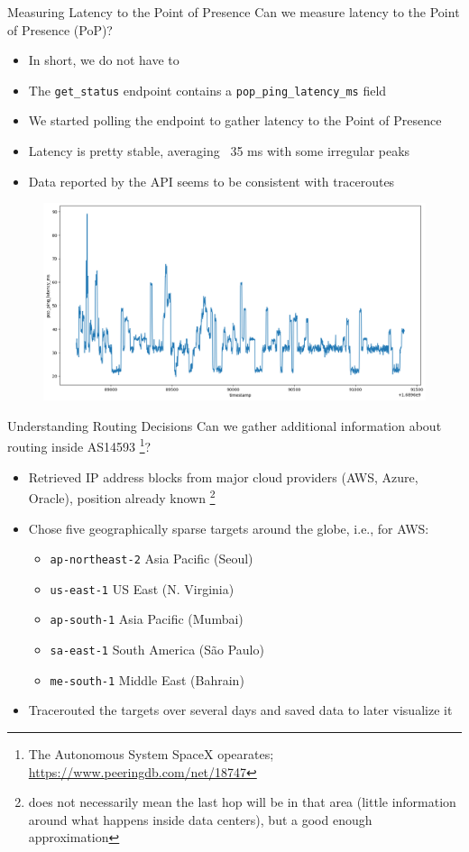 \documentclass[NET,english,beameralt]{tumbeamer}
\begin{document}
\begin{frame}{Measuring Latency to the Point of Presence}
    Can we measure latency to the Point of Presence (PoP)?
    \begin{itemize}
        \item In short, we do not have to
        \item The \texttt{get\_status} endpoint contains a  \texttt{pop\_ping\_latency\_ms} field
        \item We started polling the endpoint to gather latency to the Point of Presence
        \pause
        \item Latency is pretty stable, averaging ~35 ms with some irregular peaks
        \item Data reported by the API seems to be consistent with traceroutes
    \end{itemize}
    \begin{figure}
        \centering
        \includegraphics[width=0.6\columnwidth]{pics/latency.png}
    \end{figure}
\end{frame}

\begin{frame}{Understanding Routing Decisions}
    Can we gather additional information about routing inside AS14593 
        \footnote{The Autonomous System SpaceX opearates; \url{https://www.peeringdb.com/net/18747}}?
    \begin{itemize}
        \item Retrieved IP address blocks from major cloud providers (AWS, Azure, Oracle), position already known
            \footnote{does not necessarily mean the last hop will be in that area (little information around what happens inside data centers), 
                        but a good enough approximation}
        \item Chose five geographically sparse targets around the globe, i.e., for AWS:
            \begin{itemize}
                \item \texttt{ap-northeast-2} Asia Pacific (Seoul)
                \item \texttt{us-east-1} US East (N. Virginia)
                \item \texttt{ap-south-1} Asia Pacific (Mumbai)
                \item \texttt{sa-east-1} South America (São Paulo)
                \item \texttt{me-south-1} Middle East (Bahrain)
            \end{itemize}
        \item Tracerouted the targets over several days and saved data to later visualize it
    \end{itemize}
\end{frame}
\end{document}
